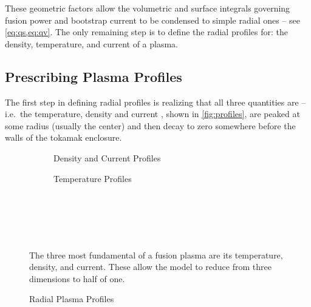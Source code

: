 These geometric factors allow the volumetric and surface integrals governing fusion power and bootstrap current to be condensed to simple radial ones -- see \cref{eq:qs,eq:qv}. The only remaining step is to define the radial profiles for: the density, temperature, and current of a plasma.

\subsection{Prescribing Plasma Profiles}

The first step in defining radial profiles is realizing that all three quantities are  -- i.e.\ the temperature, density and current , shown in \cref{fig:profiles}, are peaked at some radius (usually the center) and then decay to zero somewhere before the walls of the tokamak enclosure.


\begin{figure*}
	\label{fig:profiles}
    \centering
    \hfill 
    \begin{subfigure}[t]{0.45\textwidth}
        \centering
		\begin{adjustbox}{width=\textwidth}
			\Large
			
		\end{adjustbox}
        \caption{Density and Current Profiles}
    \end{subfigure}
    \hfill
    \begin{subfigure}[t]{0.45\textwidth}
        \centering
		\begin{adjustbox}{width=\textwidth}
			\Large
			
		\end{adjustbox}
        \caption{Temperature Profiles}
    \end{subfigure}
    \hfill \hfill ~\\ ~\\ ~\\
    \caption{Radial Plasma Profiles} ~\\
    \small The three most fundamental  of a fusion plasma are its temperature, density, and current. These  allow the model to reduce from three dimensions to  half of one.
\end{figure*}

